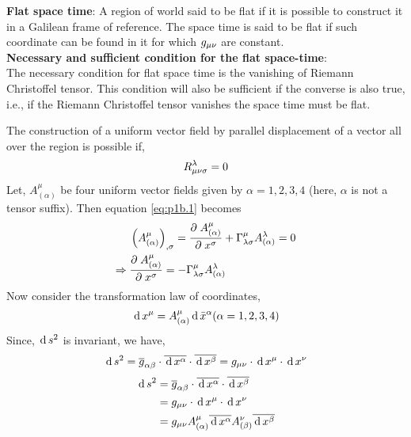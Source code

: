 \documentclass[../main-sheet.tex]{subfiles}
\begin{document}
        \begin{soln}
            \textbf{Flat space time}: A region of world said to be flat if it is possible to construct it in a Galilean frame of reference. The space time is said to be flat if such coordinate can be found in it for which \(g_{\mu\nu}\) are constant.\\

            \textbf{Necessary and sufficient condition for the flat space-time}:\\
            The necessary condition for flat space time is the vanishing of Riemann Christoffel tensor. This condition will also be sufficient if the converse is also true, i.e., if the Riemann Christoffel tensor vanishes the space time must be flat.

            The construction of a uniform vector field by parallel displacement of a vector all over the region is possible if,
            \begin{equation}
                R_{{\mu\nu}\sigma}^\lambda=0\label{eq:p1b.1}
            \end{equation}
            Let, \(A_{(\alpha)}^\mu\) be four uniform vector fields given by \(\alpha=1,2,3,4\) (here, \(\alpha\) is not a tensor suffix). Then equation \eqref{eq:p1b.1} becomes
            \begin{align}
                & \left( A_{(\alpha)}^\mu \right)_{,\sigma}=\frac{\partial\;A_{(\alpha)}^\mu}{\partial\; x^\sigma}+\Gamma_{\lambda\sigma}^\mu  A_{(\alpha)}^\lambda=0\notag\\
                \Rightarrow\;& \frac{\partial\;A_{(\alpha)}^\mu}{\partial\; x^\sigma}=-\Gamma_{\lambda\sigma}^\mu  A_{(\alpha)}^\lambda\label{eq:1b1.2}
            \end{align}
            Now consider the transformation law of coordinates,
            \[\,\mathrm{d}\, x^\mu=A_{(\alpha)}^\mu\,\mathrm{d}\, \bar{x}^\alpha (\alpha=1,2,3,4)\]
            Since, \(\,\mathrm{d}\, s^2\) is invariant, we have,
            \[
                \,\mathrm{d}\, s^2=\overline{g}_{\alpha\beta} \cdot\overline{\,\mathrm{d}\, x^\alpha}\cdot\overline{\,\mathrm{d}\, x^\beta}=g_{{\mu\nu}} \cdot \,\mathrm{d}\, x^\mu\cdot\,\mathrm{d}\, x^\nu\\
            \]
            \begin{align*}
                \,\mathrm{d}\, s^2&=\overline{g}_{\alpha\beta} \cdot\overline{\,\mathrm{d}\, x^\alpha}\cdot\overline{\,\mathrm{d}\, x^\beta}\\
                &=g_{{\mu\nu}} \cdot \,\mathrm{d}\, x^\mu\cdot\,\mathrm{d}\, x^\nu\\
                &=g_{{\mu\nu}} A_{(\alpha)}^\mu\overline{\,\mathrm{d}\, x^\alpha}A_{(\beta)}^\nu\overline{\,\mathrm{d}\, x^\beta}
            \end{align*}

\end{soln}
\end{document}
